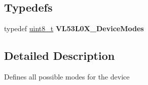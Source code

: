 \subsection*{Typedefs}
\begin{DoxyCompactItemize}
\item 
\mbox{\label{group__VL53L0X__define__DeviceModes__group_ga93bfcd3ce1b784f332b9f3533320ab8f}} 
typedef \hyperlink{vl53l0x__types_8h_aba7bc1797add20fe3efdf37ced1182c5}{uint8\+\_\+t} {\bfseries V\+L53\+L0\+X\+\_\+\+Device\+Modes}
\end{DoxyCompactItemize}


\subsection{Detailed Description}
Defines all possible modes for the device 